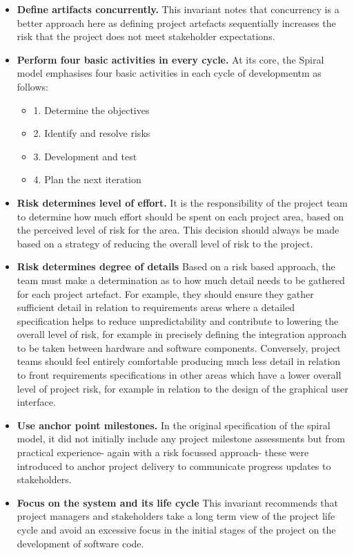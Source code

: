 \documentclass[a4paper,12pt]{article}
\begin{document}
\begin{samepage}
\begin{itemize}
\item \textbf{Define artifacts concurrently.} This invariant notes that concurrency is a better approach here as defining project artefacts sequentially increases the risk that the project does not meet stakeholder expectations.
\newpage
\item \textbf{Perform four basic activities in every cycle.}
At its core, the Spiral model emphasises four basic activities in each cycle of developmentm as follows:
\begin{itemize}
\item 1. Determine the objectives
\item 2. Identify and resolve risks 
\item 3. Development and test
\item 4. Plan the next iteration
\end{itemize}
\item \textbf {Risk determines level of effort.} It is the responsibility of the project team to determine how much effort should be spent on each project area, based on the perceived level of risk for the area. This decision should always be made based on a strategy of reducing the overall level of risk to the project.
\item \textbf {Risk determines degree of details} Based on a risk based approach, the team must make a determination as to how much detail needs to be gathered for each project artefact. For example, they should ensure they gather sufficient detail in relation to requirements areas where a detailed specification helps to reduce unpredictability and contribute to lowering the overall level of risk, for example in precisely defining the integration approach to be taken between hardware and software components. Conversely, project teams should feel entirely comfortable producing much less detail in relation to front requirements specifications in other areas which have a lower overall level of project risk, for example in relation to the design of the graphical user interface.
\item \textbf {Use anchor point milestones.} In the original specification of the spiral model, it did not initially include any project milestone assessments but from practical experience- again with a risk focussed approach- these were introduced to anchor project delivery to communicate progress updates to stakeholders.

\item \textbf {Focus on the system and its life cycle}
This invariant recommends that project managers and stakeholders take a long term view of the project life cycle and avoid an excessive focus in the initial stages of the project on the development of software code.
\end{itemize}
\newpage

\end{samepage}
\end{document}

